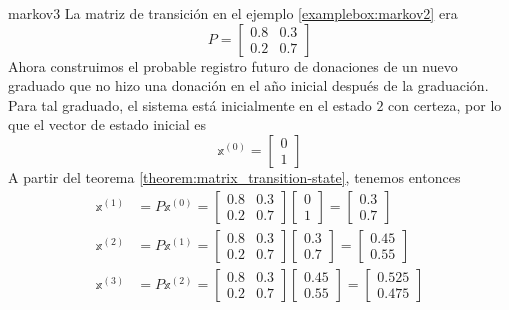 \begin{examplebox}{}{markov3}
    La matriz de transición en el ejemplo \ref{examplebox:markov2} era
    $$P = \begin{bmatrix}
        0.8 & 0.3 \\
        0.2 & 0.7
    \end{bmatrix}$$
    Ahora construimos el probable registro futuro de donaciones de un nuevo graduado que no hizo una donación en el año inicial después de la graduación. Para tal graduado, el sistema está inicialmente en el estado $2$ con certeza, por lo que el vector de estado inicial es
    $$\mathbb{x}^{(0)} = \begin{bmatrix} 0 \\ 1 \end{bmatrix}$$\newpage
    A partir del teorema \ref{theorem:matrix_transition-state}, tenemos entonces
    \begin{align*}
        \mathbb{x}^{(1)} & = P\mathbb{x}^{(0)} = \begin{bmatrix} 0.8 & 0.3 \\ 0.2 & 0.7 \end{bmatrix} \begin{bmatrix} 0 \\ 1 \end{bmatrix} = \begin{bmatrix} 0.3 \\ 0.7 \end{bmatrix} \\
        \mathbb{x}^{(2)} & = P\mathbb{x}^{(1)} = \begin{bmatrix} 0.8 & 0.3 \\ 0.2 & 0.7 \end{bmatrix} \begin{bmatrix} 0.3 \\ 0.7 \end{bmatrix} = \begin{bmatrix} 0.45 \\ 0.55 \end{bmatrix} \\
        \mathbb{x}^{(3)} & = P\mathbb{x}^{(2)} = \begin{bmatrix} 0.8 & 0.3 \\ 0.2 & 0.7 \end{bmatrix} \begin{bmatrix} 0.45 \\ 0.55 \end{bmatrix} = \begin{bmatrix} 0.525 \\ 0.475 \end{bmatrix}

\end{align*}
\end{examplebox}
